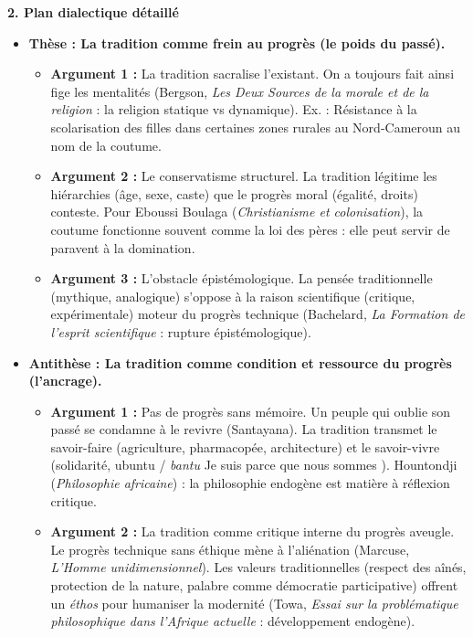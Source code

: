 \documentclass[11pt]{article}
\newcommand{\cle}[1]{{\popxbold\color{popdark}#1}}
\begin{document}
\begin{exoresolu}
    \textbf{2. Plan dialectique détaillé}
    \begin{itemize}
        \item \textbf{Thèse : La tradition comme frein au progrès (le poids du passé).}
        \begin{itemize}
            \item \textbf{Argument 1 :} La tradition sacralise l'existant. \guillemotleft On a toujours fait ainsi \guillemotright fige les mentalités (Bergson, \emph{Les Deux Sources de la morale et de la religion} : la \cle{religion statique} vs dynamique). Ex. : Résistance à la scolarisation des filles dans certaines zones rurales au Nord-Cameroun au nom de la coutume.
            \item \textbf{Argument 2 :} Le \cle{conservatisme} structurel. La tradition légitime les hiérarchies (âge, sexe, caste) que le progrès moral (égalité, droits) conteste. Pour Eboussi Boulaga (\emph{Christianisme et colonisation}), la coutume fonctionne souvent comme \guillemotleft la loi des pères \guillemotright : elle peut servir de paravent à la domination.
            \item \textbf{Argument 3 :} L'obstacle épistémologique. La pensée traditionnelle (mythique, analogique) s'oppose à la \cle{raison scientifique} (critique, expérimentale) moteur du progrès technique (Bachelard, \emph{La Formation de l'esprit scientifique} : rupture épistémologique).
        \end{itemize}
        \item \textbf{Antithèse : La tradition comme condition et ressource du progrès (l'ancrage).}
        \begin{itemize}
            \item \textbf{Argument 1 :} Pas de progrès sans mémoire. \guillemotleft Un peuple qui oublie son passé se condamne à le revivre \guillemotright (Santayana). La tradition transmet le \cle{savoir-faire} (agriculture, pharmacopée, architecture) et le \cle{savoir-vivre} (solidarité, \cle{ubuntu} / \emph{bantu} \guillemotleft Je suis parce que nous sommes \guillemotright). Hountondji (\emph{Philosophie africaine}) : la \cle{philosophie endogène} est matière à réflexion critique.
            \item \textbf{Argument 2 :} La tradition comme critique interne du \guillemotleft progrès \guillemotright aveugle. Le \cle{progrès technique} sans éthique mène à l'aliénation (Marcuse, \emph{L'Homme unidimensionnel}). Les valeurs traditionnelles (respect des aînés, protection de la nature, palabre comme démocratie participative) offrent un \emph{éthos} pour humaniser la modernité (Towa, \emph{Essai sur la problématique philosophique dans l'Afrique actuelle} : \cle{développement endogène}).

\end{itemize}
\end{itemize}
\end{exoresolu}
\end{document}
